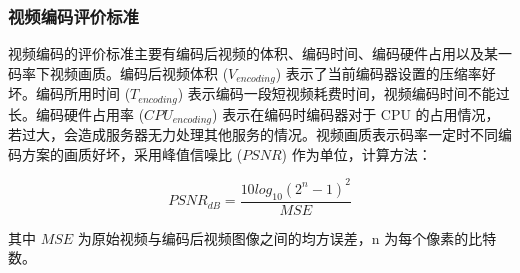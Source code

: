 \subsubsection{视频编码评价标准}

视频编码的评价标准主要有编码后视频的体积、编码时间、编码硬件占用以及某一码率下视频画质。编码后视频体积 ($V_{encoding}$) 表示了当前编码器设置的压缩率好坏。编码所用时间 ($T_{encoding}$) 表示编码一段短视频耗费时间，视频编码时间不能过长。编码硬件占用率 ($CPU_{encoding}$) 表示在编码时编码器对于 CPU 的占用情况，若过大，会造成服务器无力处理其他服务的情况。视频画质表示码率一定时不同编码方案的画质好坏，采用峰值信噪比 ($PSNR$) 作为单位\cite{毕厚杰2005新一代视频压缩编码标准}，计算方法：

\begin{equation}
\label{eq:forward_back_pre}
PSNR_{dB} = \frac{10log_{10}(2^{n} - 1)^{2}}{MSE}
\end{equation}

其中 $MSE$ 为原始视频与编码后视频图像之间的均方误差，n 为每个像素的比特数。







